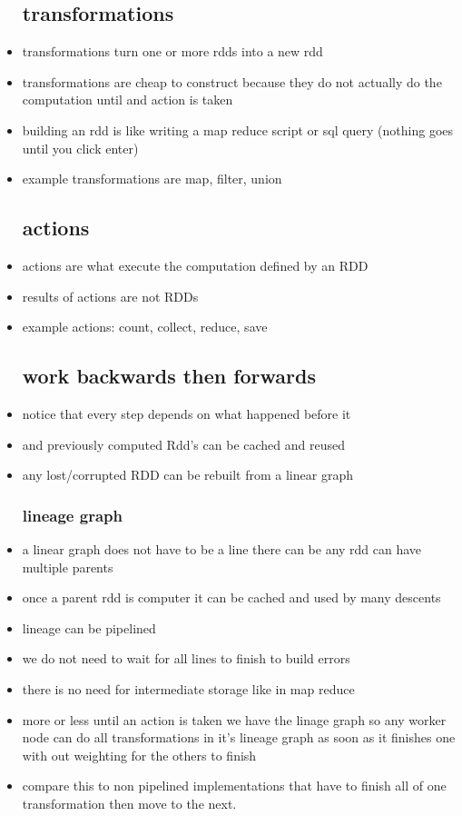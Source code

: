 \documentclass{article}
\begin{document}
\begin{itemize}
\subsection*{transformations}
\item transformations turn one or more rdds into a new rdd 
\item transformations are cheap to construct because they do not actually do the computation until and action is taken 
\item building an rdd is like writing a map reduce script or sql query (nothing goes until you click enter)
\item example transformations are map, filter, union 
\subsection*{actions}
\item actions are what execute the computation defined by an RDD
\item results of actions are not RDDs
\item example actions: count, collect, reduce, save
\subsection*{work backwards then forwards}
\item notice that every step depends on what happened before it 
\item and previously computed Rdd's can be cached and reused 
\item any lost/corrupted RDD can be rebuilt from a linear graph 
\subsubsection*{lineage graph }
\item a linear graph does not have to be a line there can be any rdd can have multiple parents 
\item once a parent rdd is computer it can be cached and used by many descents
\item lineage can be pipelined 
\item we do not need to wait for all lines to finish to build errors 
\item there is no need for intermediate storage like in map reduce 
\item more or less until an action is taken we have the linage graph so any worker node can do all transformations in it's lineage graph as soon as it finishes one with out weighting for the others to finish 
\item compare this to non pipelined implementations that have to finish all of one transformation then move to the next.

\end{itemize}
\end{document}
